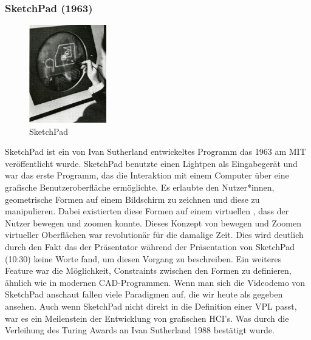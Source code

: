 \documentclass[ngerman]{article}
\begin{document}
\subsubsection{SketchPad (1963)}
\label{sec:SketchPad}
\begingroup
\setlength\intextsep{2pt}
\begin{minipage}{\linewidth}
\begin{figure}
  \centering
  \includegraphics[width=0.3\textwidth]{./graphics/sketchpad-sutherland.jpg} %
  \caption{SketchPad \cite{sutherlandSketchpad}}
\end{figure}
SketchPad ist ein von Ivan Sutherland entwickeltes Programm das 1963 am MIT veröffentlicht wurde. 
SketchPad benutzte einen Lightpen als Eingabegerät und war das erste Programm, das die Interaktion mit einem Computer über eine grafische Benutzeroberfläche ermöglichte. 
Es erlaubte den Nutzer*innen, geometrische Formen auf einem Bildschirm zu zeichnen und diese zu manipulieren.
  Dabei existierten diese Formen auf einem virtuellen , dass der Nutzer bewegen und zoomen konnte. Dieses Konzept von bewegen und Zoomen virtueller Oberflächen war revolutionär für die damalige Zeit.
  Dies wird deutlich durch den Fakt das der Präsentator während der Präsentation von SketchPad \cite{sketchpadDemo} (10:30) keine Worte fand, um diesen Vorgang zu beschreiben.
Ein weiteres Feature war die Möglichkeit, Constraints zwischen den Formen zu definieren, ähnlich wie in modernen CAD-Programmen. 
Wenn man sich die Videodemo von SketchPad anschaut fallen viele Paradigmen auf, die wir heute als gegeben ansehen.
\linebreak
\linebreak
Auch wenn SketchPad nicht direkt in die Definition einer VPL passt, war es ein Meilenstein der Entwicklung von grafischen HCI's. Was durch die Verleihung des Turing Awards an Ivan Sutherland 1988 bestätigt wurde.
\end{minipage}
\endgroup
\end{document}

